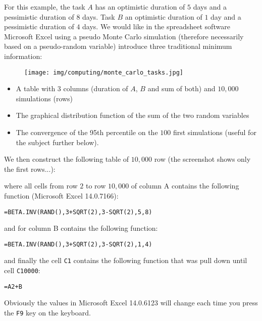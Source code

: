 	For this example, the task $A$ has an optimistic duration of $5$ days and a pessimistic duration of $8$ days. Task $B$ an optimistic duration of $1$ day and a pessimistic duration of $4$ days. We would like in the spreadsheet software Microsoft Excel using a pseudo Monte Carlo simulation (therefore necessarily based on a pseudo-random variable) introduce three traditional minimum information:
	\begin{figure}[H]
		\centering
		\texttt{[image: img/computing/monte\_carlo\_tasks.jpg]}
	\end{figure}
	\begin{itemize}
		\item A table with $3$ columns (duration of $A$, $B$ and sum of both) and $10,000$ simulations (rows)
	
		\item The graphical distribution function of the sum of the two random variables 

		\item The convergence of the 95th percentile on the $100$ first simulations (useful for the subject further below).
	\end{itemize}
	We then construct the following table of $10,000$ row (the screenshot shows only the first rows...):

	where all cells from row $2$ to row $10,000$ of column A contains the following function (Microsoft Excel 14.0.7166):

	\begin{center}
	\texttt{=BETA.INV(RAND(),3+SQRT(2),3-SQRT(2),5,8)}
	\end{center}

	and for column B contains the following function:

	\begin{center}
	\texttt{=BETA.INV(RAND(),3+SQRT(2),3-SQRT(2),1,4)}
	\end{center}

	and finally the cell \texttt{C1} contains the following function that was pull down until cell \texttt{C10000}:
	
	\begin{center}
	\texttt{=A2+B}
	\end{center}
	
	Obviously the values in Microsoft Excel 14.0.6123 will change each time you press the \texttt{F9} key on the keyboard.

